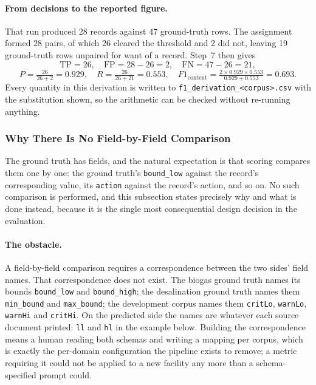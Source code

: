 \documentclass[11pt]{article}
\begin{document}
\paragraph{From decisions to the reported figure.} That run produced 28 records
against 47 ground-truth rows. The assignment formed 28 pairs, of which 26 cleared
the threshold and 2 did not, leaving 19 ground-truth rows unpaired for want of a
record. Step~7 then gives
\[
\mathrm{TP} = 26, \quad
\mathrm{FP} = 28 - 26 = 2, \quad
\mathrm{FN} = 47 - 26 = 21,
\]
\[
P = \tfrac{26}{26+2} = 0.929, \quad
R = \tfrac{26}{26+21} = 0.553, \quad
F1_{\text{content}} = \tfrac{2 \times 0.929 \times 0.553}{0.929 + 0.553} = 0.693.
\]
Every quantity in this derivation is written to
\texttt{f1\_derivation\_<corpus>.csv} with the substitution shown, so the
arithmetic can be checked without re-running anything.


\subsubsection{Why There Is No Field-by-Field Comparison}
\label{sec:no_field_matching}
The ground truth has fields, and the natural expectation is that scoring compares
them one by one: the ground truth's \texttt{bound\_low} against the record's
corresponding value, its \texttt{action} against the record's action, and so on.
No such comparison is performed, and this subsection states precisely why and
what is done instead, because it is the single most consequential design decision
in the evaluation.

\paragraph{The obstacle.} A field-by-field comparison requires a correspondence
between the two sides' field names. That correspondence does not exist. The
biogas ground truth names its bounds \texttt{bound\_low} and \texttt{bound\_high};
the desalination ground truth names them \texttt{min\_bound} and
\texttt{max\_bound}; the development corpus names them \texttt{critLo},
\texttt{warnLo}, \texttt{warnHi} and \texttt{critHi}. On the predicted side the
names are whatever each source document printed: \texttt{ll} and \texttt{hl}
in the example below. Building the correspondence means a human reading both
schemas and writing a mapping per corpus, which is exactly the per-domain
configuration the pipeline exists to remove; a metric requiring it could not be
applied to a new facility any more than a schema-specified prompt could.
\end{document}

